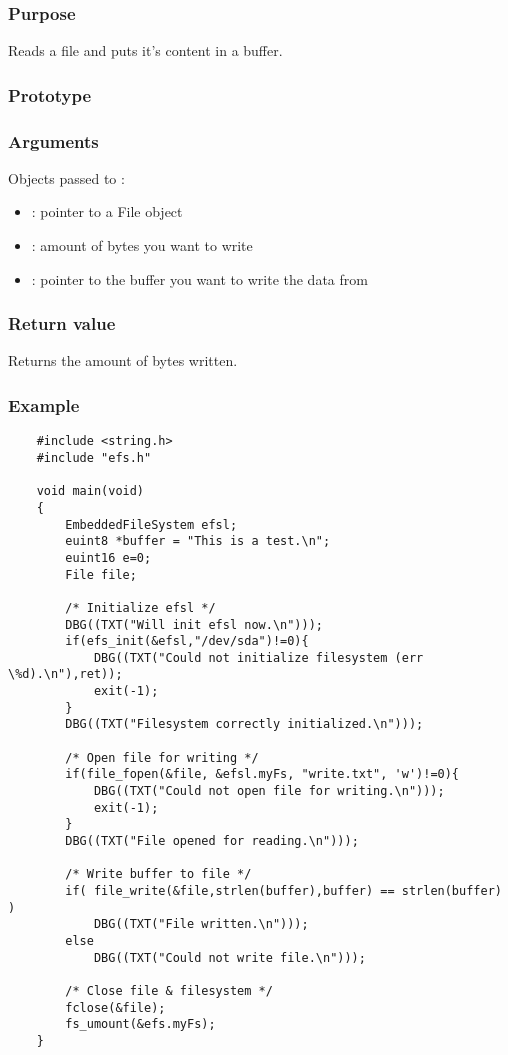 \subsubsection*{Purpose}
Reads a file and puts it's content in a buffer.
\subsubsection*{Prototype}
\subsubsection*{Arguments}
Objects passed to :
\begin{itemize}
	\item{: pointer to a File object}
	\item{: amount of bytes you want to write}
	\item{: pointer to the buffer you want to write the data from}
\end{itemize}
\subsubsection*{Return value}
Returns the amount of bytes written.
\subsubsection*{Example}
\lstset{numbers=left, stepnumber=1, numberstyle=\small, numbersep=5pt, tabsize=4}
\begin{lstlisting}
	#include <string.h>
	#include "efs.h"

	void main(void)
	{
		EmbeddedFileSystem efsl;
		euint8 *buffer = "This is a test.\n";
		euint16 e=0;
		File file;

		/* Initialize efsl */
		DBG((TXT("Will init efsl now.\n")));
		if(efs_init(&efsl,"/dev/sda")!=0){
			DBG((TXT("Could not initialize filesystem (err \%d).\n"),ret));
			exit(-1);
		}
		DBG((TXT("Filesystem correctly initialized.\n")));

		/* Open file for writing */
		if(file_fopen(&file, &efsl.myFs, "write.txt", 'w')!=0){
			DBG((TXT("Could not open file for writing.\n")));
			exit(-1);
		}
		DBG((TXT("File opened for reading.\n")));

		/* Write buffer to file */
		if( file_write(&file,strlen(buffer),buffer) == strlen(buffer) )
			DBG((TXT("File written.\n")));
		else
			DBG((TXT("Could not write file.\n")));
		
		/* Close file & filesystem */
		fclose(&file);
		fs_umount(&efs.myFs);
	}
\end{lstlisting}
